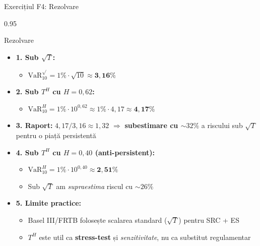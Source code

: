 \documentclass[9pt, aspectratio=169, t]{beamer}
\begin{document}
\begin{frame}[shrink=25]{Exercițiul F4: Rezolvare}
\begin{cminipage}{0.95\textwidth}
\begin{exampleblock}{Rezolvare}
\begin{itemize}\setlength{\itemsep}{0pt}
    \item \textbf{1. Sub $\sqrt T$:}
    \begin{itemize}\setlength{\itemsep}{0pt}
        \item $\text{VaR}_{10}^{\sqrt{}} = 1\% \cdot \sqrt{10} \approx \mathbf{3{,}16\%}$
    \end{itemize}
    \item \textbf{2. Sub $T^H$ cu $H = 0{,}62$:}
    \begin{itemize}\setlength{\itemsep}{0pt}
        \item $\text{VaR}_{10}^{H} = 1\% \cdot 10^{0{,}62} \approx 1\% \cdot 4{,}17 \approx \mathbf{4{,}17\%}$
    \end{itemize}
    \item \textbf{3. Raport:} $4{,}17/3{,}16 \approx 1{,}32$ $\Rightarrow$ \textbf{subestimare cu $\sim 32\%$} a riscului sub $\sqrt T$ pentru o piață persistentă
    \item \textbf{4. Sub $T^H$ cu $H = 0{,}40$ (anti-persistent):}
    \begin{itemize}\setlength{\itemsep}{0pt}
        \item $\text{VaR}_{10}^H = 1\% \cdot 10^{0{,}40} \approx \mathbf{2{,}51\%}$
        \item Sub $\sqrt T$ am \emph{supraestima} riscul cu $\sim 26\%$
    \end{itemize}
    \item \textbf{5. Limite practice:}
    \begin{itemize}\setlength{\itemsep}{0pt}
        \item Basel III/FRTB folosește scalarea standard ($\sqrt T$) pentru SRC + ES
        \item $T^H$ este util ca \textbf{stress-test} și \emph{senzitivitate}, nu ca substitut regulamentar
    \end{itemize}
\end{itemize}
\end{exampleblock}
\end{cminipage}
\end{frame}
\end{document}
